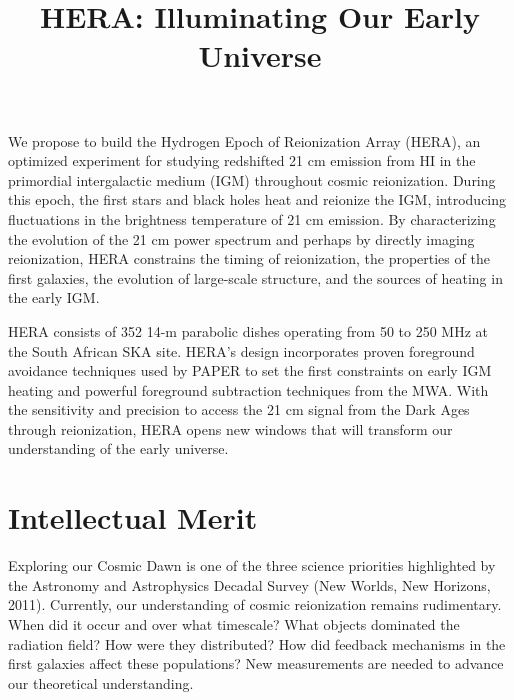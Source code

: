 \documentclass[preprint]{aastex}
\begin{document}
\pagestyle{empty}


\title{HERA: Illuminating Our Early Universe}

We propose to build the Hydrogen Epoch of Reionization Array (HERA), an optimized experiment for studying redshifted 21 cm emission from HI in the primordial intergalactic medium (IGM) throughout cosmic reionization. During this epoch, the first stars and black holes heat and reionize the IGM, introducing fluctuations in the brightness temperature of 21 cm emission. By characterizing the evolution of the 21 cm power spectrum and perhaps by directly imaging reionization, HERA constrains the timing of reionization, the properties of the first galaxies, the evolution of large-scale structure, and the sources of heating in the early IGM.

HERA consists of 352 14-m parabolic dishes operating from 50 to 250 MHz at the South African SKA site. HERA's design incorporates proven foreground avoidance techniques used by PAPER to set the first constraints on early IGM heating and powerful foreground subtraction techniques from the MWA.  With the sensitivity and precision to access the 21 cm signal from the Dark Ages through reionization, HERA opens new windows that will transform our understanding of the early universe.

\section*{Intellectual Merit}
 
Exploring our Cosmic Dawn is one of the three science priorities highlighted by the Astronomy and Astrophysics Decadal Survey (New Worlds, New Horizons, 2011).  Currently, our understanding of cosmic reionization remains rudimentary. When did it occur and over what timescale?  What objects dominated the radiation field? How were they distributed? How did feedback mechanisms in the first galaxies affect these populations? New measurements are needed to advance our theoretical understanding.
\end{document}
